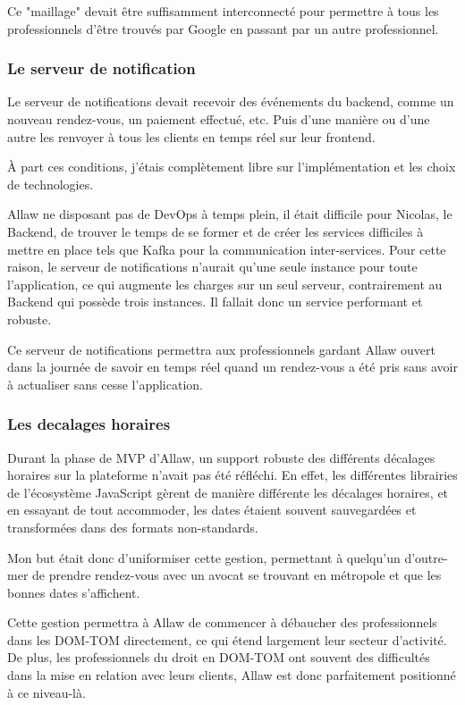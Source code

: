 Ce "maillage" devait être suffisamment interconnecté pour permettre à tous les
professionnels d'être trouvés par Google en passant par un autre professionnel.

\subsubsection{Le serveur de notification}

Le serveur de notifications devait recevoir des événements du backend, comme
un nouveau rendez-vous, un paiement effectué, etc. Puis d'une manière ou d'une
autre les renvoyer à tous les clients en temps réel sur leur frontend.

À part ces conditions, j'étais complètement libre sur l'implémentation et les
choix de technologies.

Allaw ne disposant pas de DevOps à temps plein, il était difficile pour Nicolas,
le Backend, de trouver le temps de se former et de créer les services difficiles
à mettre en place tels que Kafka pour la communication inter-services. Pour
cette raison, le serveur de notifications n'aurait qu'une seule instance
pour toute l'application, ce qui augmente les charges sur un seul serveur,
contrairement au Backend qui possède trois instances. Il fallait donc un service
performant et robuste.

Ce serveur de notifications permettra aux professionnels gardant Allaw ouvert
dans la journée de savoir en temps réel quand un rendez-vous a été pris sans
avoir à actualiser sans cesse l'application.

\subsubsection{Les decalages horaires}

Durant la phase de MVP d'Allaw, un support robuste des différents décalages
horaires sur la plateforme n'avait pas été réfléchi. En effet, les différentes
librairies de l'écosystème JavaScript gèrent de manière différente les
décalages horaires, et en essayant de tout accommoder, les dates étaient souvent
sauvegardées et transformées dans des formats non-standards.

Mon but était donc d'uniformiser cette gestion, permettant à quelqu'un
d'outre-mer de prendre rendez-vous avec un avocat se trouvant en métropole et
que les bonnes dates s'affichent.

Cette gestion permettra à Allaw de commencer à débaucher des professionnels
dans les DOM-TOM directement, ce qui étend largement leur secteur d'activité.
De plus, les professionnels du droit en DOM-TOM ont souvent des difficultés dans
la mise en relation avec leurs clients, Allaw est donc parfaitement positionné à
ce niveau-là.

